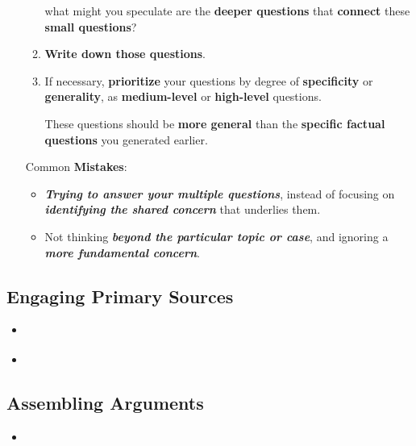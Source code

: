 \documentclass[11pt]{article}
\begin{document}
\begin{itemize}
\begin{exercise}
\begin{enumerate}
what might you speculate are the \textbf{deeper questions} that \textbf{connect} these \textbf{small questions}?

\item \textbf{Write down those questions}.

\item If necessary, \textbf{prioritize} your questions by degree of \textbf{specificity} or \textbf{generality}, as \textbf{medium-level} or \textbf{high-level} questions. 

These questions should be \textbf{more general} than the \textbf{specific factual questions} you generated earlier.
\end{enumerate}
\end{exercise}
Common \textbf{Mistakes}:
\begin{itemize}
\item \textbf{\emph{Trying to answer your multiple questions}}, instead of focusing on \textbf{\emph{identifying the shared concern}} that underlies them. 

\item Not thinking \textbf{\emph{beyond the particular topic or case}}, and ignoring a \textbf{\emph{more fundamental concern}}.
\end{itemize}


\end{itemize}
\subsection{Engaging Primary Sources}
\begin{itemize}
\item  \begin{exercise}
\end{exercise}

\vspace{20pt}
\item \begin{exercise}
\end{exercise} 
\end{itemize}
\subsection{Assembling Arguments}
\begin{itemize}
\item \begin{exercise}
\end{exercise}
\end{itemize}
\end{document}
